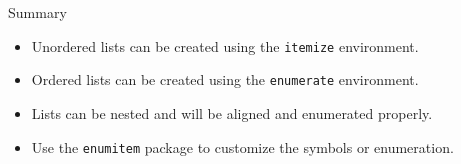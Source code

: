 \documentclass{beamer}
\begin{document}
\begin{frame}{Summary}
  \begin{itemize}
    \item Unordered lists can be created using the \texttt{itemize} environment.
    \item Ordered lists can be created using the \texttt{enumerate} environment.
    \item Lists can be nested and will be aligned and enumerated properly.
    \item Use the \texttt{enumitem} package to customize the symbols or enumeration.
  \end{itemize}
\end{frame}
\end{document}
